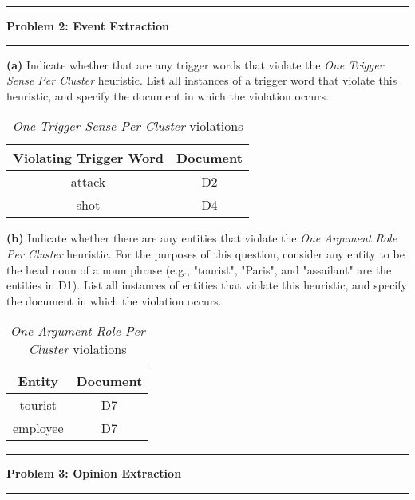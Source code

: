 \documentclass[11pt]{article}
\newcommand\question[2]{\vspace{.25in}\hrule\textbf{#1: #2}\vspace{.5em}\hrule\vspace{.10in}}
\renewcommand\part[1]{\vspace{.10in}\textbf{(#1)}}
\begin{document}

\question{Problem 2}{Event Extraction}


\part{a} Indicate whether that are any trigger words that violate the \textit{One Trigger Sense Per Cluster} heuristic. List all instances of a trigger word that violate this heuristic, and specify the document in which the violation occurs.

 \begin{table}[H]
\centering
{\renewcommand{\arraystretch}{1.2}%
\begin{tabular}{| c | c |}
\hline
\textbf{Violating Trigger Word} & \textbf{Document}\\
\hline
attack & D2 \\ \hline
shot & D4 \\ \hline
\end{tabular}}
\caption{\textit{One Trigger Sense Per Cluster} violations}
\end{table}

\part{b} Indicate whether there are any entities that violate the \textit{One Argument Role Per Cluster} heuristic. For the purposes of this question, consider any entity to be the head noun of a noun phrase (e.g., "tourist", "Paris", and "assailant" are the entities in D1). List all instances of entities that violate this heuristic, and specify the document in which the violation occurs.

 \begin{table}[H]
\centering
{\renewcommand{\arraystretch}{1.2}%
\begin{tabular}{| c | c |}
\hline
\textbf{Entity} & \textbf{Document}\\
\hline
tourist & D7 \\ \hline
employee & D7 \\ \hline
\end{tabular}}
\caption{\textit{One Argument Role Per Cluster} violations}
\end{table}

\question{Problem 3}{Opinion Extraction}
\end{document}
